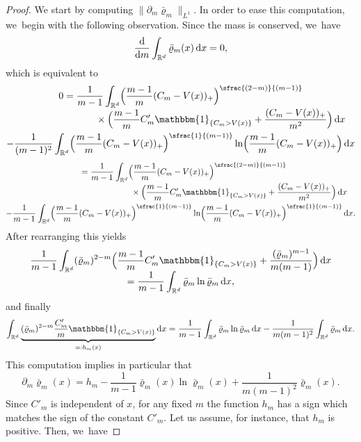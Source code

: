 \documentclass[JEP,XML,SOM,Unicode,published]{cedram}
\newcommand{\spfrac}[2]{\sfrac{#1}{(#2)}}
\newcommand{\pspfrac}[2]{\sfrac{(#1)}{(#2)}}
\let\mathds\mathbbm
\newcommand{\Bprt}[1]{\Bigl(#1\Bigr)}
\newcommand{\dx}[1]{\mathop{}\!\mathrm{d} #1}
\newcommand{\R}{\mathbb{R}}
\theoremstyle{plain}
\theoremstyle{remark}
\begin{document}
\begin{proof}
We start by computing $\|\partial_m \bar\varrho_m\|_{L^1}$. In order to ease this computation, we~begin with the following observation.
Since the mass is conserved, we~have
\begin{align*}
\frac{\dx}{\dx m} \int_{\R^d} \bar\varrho_m(x) \dx x = 0,
\end{align*}
which is equivalent to
\begin{multline*}
0= \frac{1}{m-1}\int_{\R^d} \Bprt{\frac{m-1}{m}(C_m - V(x))_+}^{\pspfrac{2-m}{m-1}}\\[-3pt]
\shoveright{{}\times\Bprt{\frac{m-1}{m}C'_m{\mathds{1}_{\{C_m > V(x)\}}} + \frac{(C_m - V(x))_+}{m^2}} \dx x}\\
- {\frac{1}{(m-1)^{2}}} \int_{\R^d} \Bprt{\frac{m-1}{m}(C_m - V(x))_+}^{\spfrac{1}{m-1}} \ln \Bprt{\frac{m-1}{m}(C_m - V(x))_+} \dx x
\end{multline*}
\begin{multline*}
\hphantom{0} = \frac{1}{m-1}\int_{\R^d} \Bprt{\frac{m-1}{m}(C_m - V(x))_+}^{\pspfrac{2-m}{m-1}}\\[-3pt]
\shoveright{{}\times\Bprt{\frac{m-1}{m}C'_m{\mathds{1}_{\{C_m > V(x)\}}} + \frac{(C_m - V(x))_+}{m^2}} \dx x} \\
- \frac{1}{m-1} \int_{\R^d} \Bprt{\frac{m-1}{m}(C_m - V(x))_+}^{\spfrac{1}{m-1}} \ln \Bprt{\frac{m-1}{m}(C_m - V(x))_+}^{\spfrac{1}{m-1}} \dx x.
\end{multline*}
After rearranging this yields
\begin{multline*}
\frac{1}{m-1}\int_{\R^d} (\bar\varrho_m)^{2-m} \Bprt{\frac{m-1}{m}C'_m{\mathds{1}_{\{C_m > V(x)\}}} + \frac{(\bar\varrho_m)^{m-1}}{m(m-1)}} \dx x\\[-5pt]
= \frac{1}{m-1} \int_{\R^d} \bar\varrho_m \ln \bar\varrho_m \dx x,
\end{multline*}
and finally
\begin{align*}
\int_{\R^d} \underbrace{(\bar\varrho_m)^{2-m} \frac{C'_m}{m}{{\mathds{1}_{\{C_m > V(x)\}}}}}_{=:h_m(x)}\dx x= \frac{1}{m-1} \int_{\R^d} \bar\varrho_m \ln \bar\varrho_m\dx x - \frac{1}{m(m-1)^2}\int_{\R^d} \bar\varrho_m \dx x.
\end{align*}
This computation implies in particular that
\[
\partial_{m}\bar \varrho_m(x) = h_m - \frac{1}{m-1}\bar\varrho_m(x) \ln \bar\varrho_m(x) + \frac{1}{m(m-1)^2}\bar\varrho_m(x).
\]
Since $C'_m$ is independent of $x$, for any fixed $m$ the function $h_m$ has a sign which matches the sign of the constant $C'_{m}$. Let us assume, for instance, that $h_m$ is positive. Then, we~have

\end{proof}
\end{document}
